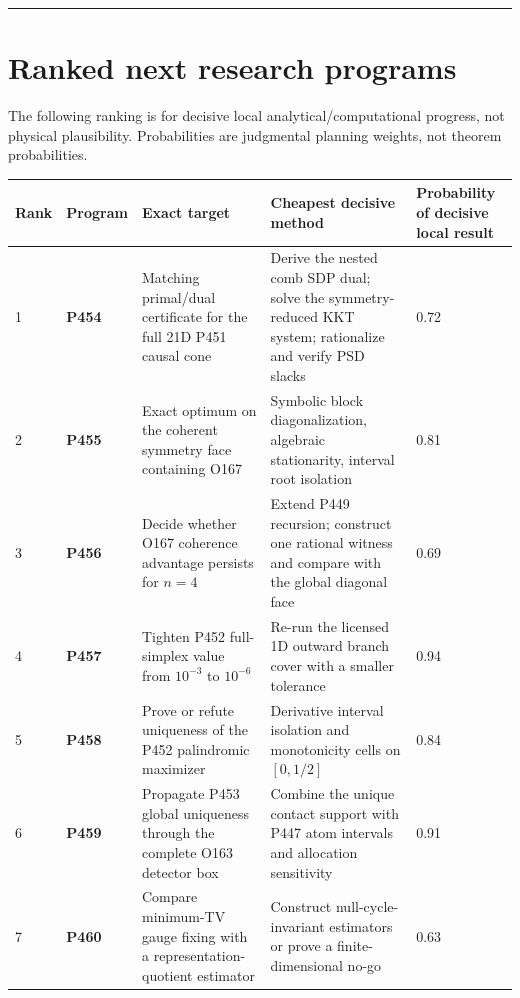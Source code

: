 \documentclass[11pt,a4paper,openany]{report}
\begin{document}
\par\medskip\hrule\medskip

\chapter{Ranked next research programs}

The following ranking is for decisive local analytical/\allowbreak{}computational progress, not physical plausibility. Probabilities are judgmental planning weights, not theorem probabilities.

\begin{center}
\begingroup\fontsize{7}{8.4}\selectfont
\setlength{\tabcolsep}{2.5pt}
\renewcommand{\arraystretch}{1.16}
\begin{longtable}{@{}p{}p{}p{}p{}p{}@{}}
\toprule
\textbf{Rank} & \textbf{Program} & \textbf{Exact target} & \textbf{Cheapest decisive method} & \textbf{Probability of decisive local result} \\
\midrule
\endhead
1 & \textbf{P454} & Matching primal/\allowbreak{}dual certificate for the full 21D P451 causal cone & Derive the nested comb SDP dual; solve the symmetry-reduced KKT system; rationalize and verify PSD slacks & 0.72 \\
2 & \textbf{P455} & Exact optimum on the coherent symmetry face containing O167 & Symbolic block diagonalization, algebraic stationarity, interval root isolation & 0.81 \\
3 & \textbf{P456} & Decide whether O167 coherence advantage persists for \(n=4\) & Extend P449 recursion; construct one rational witness and compare with the global diagonal face & 0.69 \\
4 & \textbf{P457} & Tighten P452 full-simplex value from \(10^{-3}\) to \(10^{-6}\) & Re-run the licensed 1D outward branch cover with a smaller tolerance & 0.94 \\
5 & \textbf{P458} & Prove or refute uniqueness of the P452 palindromic maximizer & Derivative interval isolation and monotonicity cells on \([0,1/2]\) & 0.84 \\
6 & \textbf{P459} & Propagate P453 global uniqueness through the complete O163 detector box & Combine the unique contact support with P447 atom intervals and allocation sensitivity & 0.91 \\
7 & \textbf{P460} & Compare minimum-TV gauge fixing with a representation-quotient estimator & Construct null-cycle-invariant estimators or prove a finite-dimensional no-go & 0.63 \\

\end{longtable}
\end{center}
\end{document}
